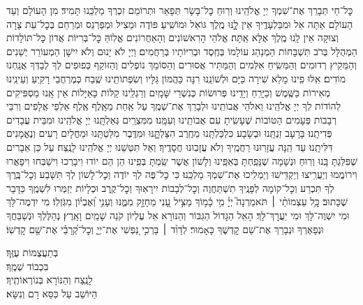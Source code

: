 \documentclass[twoside, openany, parskip=half, 11pt]{book}
\begin{document}
\label{nishmas}
כׇּל־חַי תְּבָרֵךְ אֶת־שִׁמְךָ יְיָ אֱלֹהֵֽינוּ וְרֽוּחַ כׇּל־בָּשָׂר תְּפָאֵר וּתְרוֹמֵם זִכְרְךָ מַלְכֵּֽנוּ תָּמִיד׃ מִן הָעוֹלָם וְעַד הָעוֹלָם אַתָּה אֵל וּמִבַּלְעָדֶֽיךָ אֵין לׇׇֽנּוּ מֶֽלֶךְ גּוֹאֵל וּמוֹשִֽׁיעַ׃
פּוֹדֶה וּמַצִיל וּמְפַרְנֵס וּמְרַחֵם בְּכׇל־עֵת צָרָה וְצוּקָה אֵין לָֽנוּ מֶֽלֶךְ אֶלָּא אַֽתָּה׃ אֱלֹהֵי הָרִאשׁוֹנִים וְהָאַחֲרוֹנִים אֱלֽוֹהַּ כׇּל־בְּרִיּוֹת אֲדוֹן כׇּל־תּוֹלָדוֹת הַמְהֻלָּל בְּרֹב תִּשְׁבָּחוֹת הַמְנַהֵג עוֹלָמוֹ בְּחֶֽסֶד וּבְרִיּוֹתָיו בְּרַחֲמִים׃ וַיְיָ לֹא יָנוּם וְלֹא יִישָׁן הַמְעוֹרֵר יְשֵׁנִים וְהַמֵּקִיץ רְדוּמִים וְהַמֵּשִֽׂיחַ אִלְּמִים וְהַמַּתִּיר אֲסוּרִים וְהַסּוֹמֵךְ נוֹפְלִים וְהַזּוֹקֵף כְּפוּפִים לְךָ לְבַדְּךָ אֲנַֽחְנוּ מוֹדִים׃ אִֽלּוּ פִֽינוּ מָלֵא שִׁירָה כַּיָּם וּלְשׁוֹנֵֽנוּ רִנָּה כַּהֲמוֹן גַּלָּיו וְשִׂפְתוֹתֵֽינוּ שֶֽׁבַח כְּמֶרְחֲבֵי רָקִֽיעַ וְעֵינֵֽינוּ מְאִירוֹת כַּשֶּֽׁמֶשׁ וְכַיָּרֵֽחַ וְיָדֵֽינוּ פְּרוּשׂוֹת כְּנִשְׁרֵי שָּׁמָֽיִם וְרַגְלֵֽינוּ קַלּוֹת כָּאַיָּלוֹת אֵין אָֽנוּ מַסְפִּיקִים לְהוֹדוֹת לְךָ יְיָ אֱלֹהֵֽינוּ וֵאלֹהֵי אֲבוֹתֵֽינוּ וּלְבָרֵךְ אֶת־שְׁמֶֽךָ עַל אַֽחַת מֵאָֽלֶף אֶֽלֶף אַלְפֵי אֲלָפִים וְרִבֵּי רְבָבוֹת פְּעָמִים הַטּוֹבוֹת שֶׁעָשִֽׂיתָ עִם אֲבוֹתֵֽינוּ וְעִמָּֽנוּ׃ מִמִּצְרַֽיִם גְּאַלְתָּֽנוּ יְיָ אֱלֹהֵֽינוּ וּמִבֵּית עֲבָדִים פְּדִיתָֽנוּ׃ בָּרָעָב זַנְתָּֽנוּ וּבְשָׂבָע כִּלְכַּלְתָּֽנוּ מֵחֶֽרֶב הִצַּלְתׇׇּֽנּוּ וּמִדֶּֽבֶר מִלַּטְתָּֽנוּ וּמֵחֳלָיִם רָעִים וְנֶאֱמָנִים דִּלִּיתָֽנוּ׃ עַד הֵֽנָּה עֲזָרֽוּנוּ רַחֲמֶֽיךָ וְלֹא עֲזָבֽוּנוּ חֲסָדֶֽיךָ׃ וְאַל תִּטְּשֵׁנוּ יְיָ אֱלֹהֵֽינוּ לָנֶֽצַח׃ עַל כֵּן אֵבָרִים שֶׁפִּלַּגְתָּ בָּֽנוּ וְרֽוּחַ וּנְשָׁמָה שֶׁנָּפַֽחְתָּ בְּאַפֵּֽינוּ וְלָשׁוֹן אֲשֶׁר שַֽׂמְתָּ בְּפִֽינוּ הֵן הֵם יוֹדוּ וִיבָרְכוּ וִישַׁבְּחוּ וִיפָאֲרוּ וִירוֹמֲמוּ וְיַעֲרִֽיצוּ וְיַקְדִּֽישׁוּ וְיַמְלִֽיכוּ אֶת־שִׁמְךָ מַלְכֵּֽנוּ׃ כִּי כׇל־פֶּה לְךָ יוֹדֶה וְכׇל־לָשׁוֹן לְךָ תִּשָּׁבַע וְכׇל־בֶּֽרֶךְ לְךָ תִּכְרַע וְכׇל־קוֹמָה לְפָנֶֽיךָ תִשְׁתַּחֲוֶה וְכׇל־לְבָבוֹת יִירָאֽוּךָ וְכׇל־קֶֽרֶב וּכְלָיוֹת יְזַמְּרוּ לִשְׁמֶֽךָ כַּדָּבָר שֶׁכָּתוּב׃
כׇּ‍֥ל עַצְמוֹתַ֨י ׀ תֹּאמַרְנָה֮ יְיָ֗ מִ֥י כָ֫מ֥וֹךָ מַצִּ֣יל עָ֭נִי מֵחָזָ֣ק מִמֶּ֑נּוּ וְעָנִ֥י וְ֝אֶבְי֗וֹן מִגֹּֽזְלֽוֹ׃
מִי יִדְמֶה־לָּךְ וּמִי יִשְׁוֶה־לָּךְ וּמִי יַעֲרׇךְ־לָּךְ׃ הָאֵל הַגָּדוֹל הַגִּבּוֹר וְהַנּוֹרָא אֵל עֶלְיוֹן קֹנֵה שָׁמַֽיִם וָאָֽרֶץ׃
נְהַלֶּלְךָ וּנְשַׁבֵּחֲךָ וּנְפָאֶרְךָ וּנְבָרֵךְ אֶת־שֵׁם קׇדְשֶׁךָ כָּאָמוּר׃
לְדָוִ֨ד  ׀ בָּרְכִ֣י נַ֭פְשִׁי אֶת־יְיָ֑ וְכׇל־קְ֝רָבַ֗י אֶת־שֵׁ֥ם קׇדְשֽׁוֹ׃


בְּתַעֲצֻמוֹת עֻזֶּֽךָ׃\\
בִּכְבוֹד שְׁמֶֽךָ׃\\
לָנֶֽצַח וְהַנּוֹרָא בְּנוֹרְאוֹתֶֽיךָ׃\\
הַיּוֹשֵׁב עַל כִּסֵּא רָם וְנִשָּׂא׃
\end{document}
